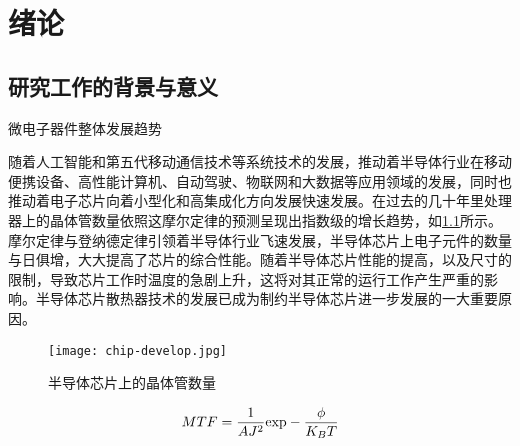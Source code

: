     
\chapter{绪\quad 论}
\section{研究工作的背景与意义}

\begin{shaded}
    微电子器件整体发展趋势  
    \end{shaded}
    随着人工智能和第五代移动通信技术等系统技术的发展，推动着半导体行业在移动便携设备、高性能计算机、自动驾驶、物联\cite{lau_recent_2022}网和大数据等应用领域的发展\cite{lau_recent_2022}，同时也推动着电子芯片向着小型化和高集成化方向发展快速发展\cite{sadique_heat_2022}。在过去的几十年里处理器上的晶体管数量依照这摩尔定律\cite{moore_cramming_1965}的预测呈现出指数级的增长趋势，如\cref{chip-develop}所示。摩尔定律与登纳德定律\cite{dennard_design_1974}引领着半导体行业飞速发展，半导体芯片上电子元件的数量与日俱增，大大提高了芯片的综合性能。随着半导体芯片性能的提高，以及尺寸的限制，导致芯片工作时温度的急剧上升，这将对其正常的运行工作产生严重的影响。半导体芯片散热器技术的发展已成为制约半导体芯片进一步发展的一大重要原因。

    \begin{figure}[h]
        \texttt{[image: chip-develop.jpg]}
        \caption{半导体芯片上的晶体管数量}
        \label{chip-develop}
        \end{figure}


    \begin{equation}
        MTF = \frac{1}{{A{J^2}}}{\rm{exp}} - \frac{\phi }{{{K_B}T}}
        \label{MTF}
        \end{equation}



